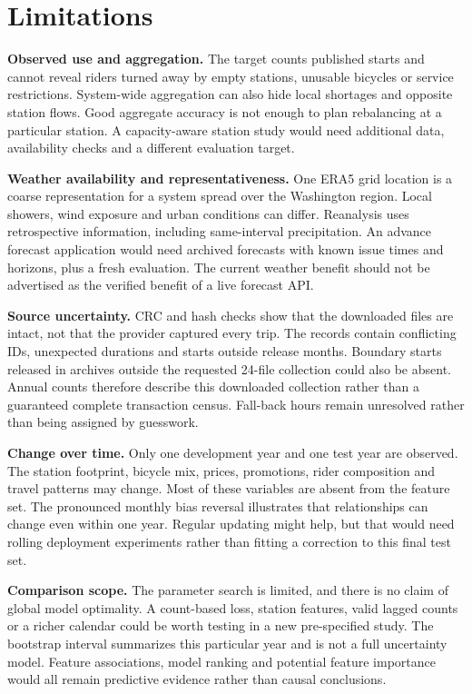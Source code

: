 \documentclass[10pt]{article}
\begin{document}
\FloatBarrier
\section{Limitations}
\textbf{Observed use and aggregation.} The target counts published starts and cannot reveal riders turned away by empty stations, unusable bicycles or service restrictions. System-wide aggregation can also hide local shortages and opposite station flows. Good aggregate accuracy is not enough to plan rebalancing at a particular station. A capacity-aware station study would need additional data, availability checks and a different evaluation target.

\textbf{Weather availability and representativeness.} One ERA5 grid location is a coarse representation for a system spread over the Washington region. Local showers, wind exposure and urban conditions can differ. Reanalysis uses retrospective information, including same-interval precipitation. An advance forecast application would need archived forecasts with known issue times and horizons, plus a fresh evaluation. The current weather benefit should not be advertised as the verified benefit of a live forecast API.

\textbf{Source uncertainty.} CRC and hash checks show that the downloaded files are intact, not that the provider captured every trip. The records contain conflicting IDs, unexpected durations and starts outside release months. Boundary starts released in archives outside the requested 24-file collection could also be absent. Annual counts therefore describe this downloaded collection rather than a guaranteed complete transaction census. Fall-back hours remain unresolved rather than being assigned by guesswork.

\textbf{Change over time.} Only one development year and one test year are observed. The station footprint, bicycle mix, prices, promotions, rider composition and travel patterns may change. Most of these variables are absent from the feature set. The pronounced monthly bias reversal illustrates that relationships can change even within one year. Regular updating might help, but that would need rolling deployment experiments rather than fitting a correction to this final test set.

\textbf{Comparison scope.} The parameter search is limited, and there is no claim of global model optimality. A count-based loss, station features, valid lagged counts or a richer calendar could be worth testing in a new pre-specified study. The bootstrap interval summarizes this particular year and is not a full uncertainty model. Feature associations, model ranking and potential feature importance would all remain predictive evidence rather than causal conclusions.
\end{document}
